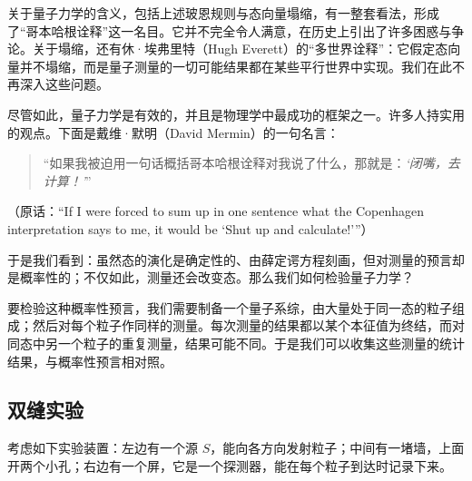关于量子力学的含义，包括上述玻恩规则与态向量塌缩，有一整套看法，形成了“哥本哈根诠释”这一名目。它并不完全令人满意，在历史上引出了许多困惑与争论。关于塌缩，还有休·埃弗里特（Hugh Everett）的“多世界诠释”：它假定态向量并不塌缩，而是量子测量的一切可能结果都在某些平行世界中实现。我们在此不再深入这些问题。

尽管如此，量子力学是有效的，并且是物理学中最成功的框架之一。许多人持实用的观点。下面是戴维·默明（David Mermin）的一句名言：

\begin{quote}
“如果我被迫用一句话概括哥本哈根诠释对我说了什么，那就是：\emph{‘闭嘴，去计算！’}”
\end{quote}
{\small （原话：“If I were forced to sum up in one sentence what the Copenhagen interpretation says to me, it would be ‘Shut up and calculate!’”）\par}

于是我们看到：虽然态的演化是确定性的、由薛定谔方程刻画，但对测量的预言却是概率性的；不仅如此，测量还会改变态。那么我们如何检验量子力学？

要检验这种概率性预言，我们需要制备一个量子系综，由大量处于同一态的粒子组成；然后对每个粒子作同样的测量。每次测量的结果都以某个本征值为终结，而对同态中另一个粒子的重复测量，结果可能不同。于是我们可以收集这些测量的统计结果，与概率性预言相对照。

\subsection{双缝实验}

考虑如下实验装置：左边有一个源 $S$，能向各方向发射粒子；中间有一堵墙，上面开两个小孔；右边有一个屏，它是一个探测器，能在每个粒子到达时记录下来。

\begin{center}
\end{center}

